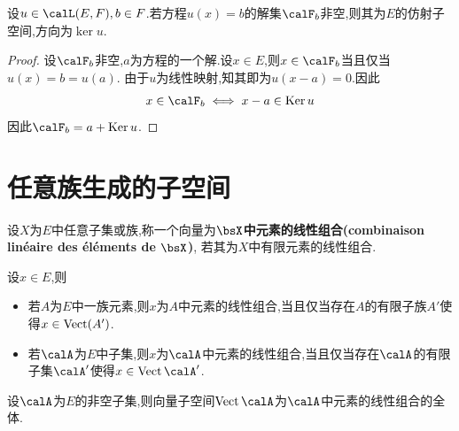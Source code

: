 \begin{prop}
    设$u \in \calL(E, F), b \in F$.若方程$u(x) = b$的解集$\calF_b$非空,则其为$E$的仿射子空间,方向为$\ker u$.
\end{prop}

\begin{proof}
    设$\calF_b$非空,$a$为方程的一个解.设$x \in E$,则$x \in \calF_b$当且仅当$u(x) = b = u(a)$.
    由于$u$为线性映射,知其即为$u(x - a) = 0$.因此\[ x \in \calF_b \iff x - a \in \ker u \]
    因此$\calF_b = a + \ker u$.
\end{proof}

\section{任意族生成的子空间}

\begin{deff}
    设$X$为$E$中任意子集或族,称一个向量为\textbf{$\bsX$中元素的线性组合(combinaison linéaire des éléments de $\bsX$)},
    若其为$X$中有限元素的线性组合.
\end{deff}

\begin{rqq}
    设$x \in E$,则

    \begin{itemize}
        \item 若$A$为$E$中一族元素,则$x$为$A$中元素的线性组合,当且仅当存在$A$的有限子族$A'$使得$x \in \operatorname{Vect}(A')$.
        \item 若$\calA$为$E$中子集,则$x$为$\calA$中元素的线性组合,当且仅当存在$\calA$的有限子集$\calA'$使得$x \in \vect \calA'$.
    \end{itemize}
\end{rqq}

\begin{prop}
    设$\calA$为$E$的非空子集,则向量子空间$\vect \calA$为$\calA$中元素的线性组合的全体.
\end{prop}

